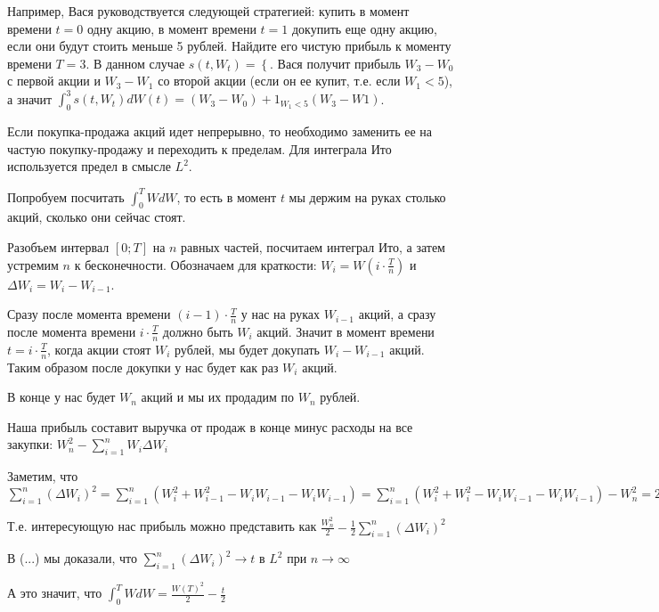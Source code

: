 {\begin{myex} Например, Вася руководствуется следующей стратегией: купить в момент времени $t=0$ одну акцию, в момент времени $t=1$ докупить еще одну акцию, если они будут стоить меньше 5 рублей. Найдите его чистую прибыль к моменту времени $T=3$. В данном случае $s(t,W_{t})=\left\{ \right.$. Вася получит прибыль $W_{3}-W_{0}$ с первой акции и $W_{3}-W_{1}$ со второй акции (если он ее купит, т.е. если $W_{1}<5$), а значит $\int_{0}^{3}s(t,W_{t})dW(t)=(W_{3}-W_{0})+1_{W_{1}<5}(W_{3}-W{1})$. 
\end{myex}

Если покупка-продажа акций идет непрерывно, то необходимо заменить ее на частую покупку-продажу и переходить к пределам. Для интеграла Ито используется предел в смысле $L^{2}$. 

\begin{myex} Попробуем посчитать $\int_{0}^{T}WdW$, то есть в момент $t$ мы держим на руках столько акций, сколько они сейчас стоят.

Разобъем интервал $[0;T]$ на $n$ равных частей, посчитаем интеграл Ито, а затем устремим $n$ к бесконечности.
Обозначаем для краткости: $W_{i}=W(i\cdot \frac{T}{n})$ и $\Delta W_{i}=W_{i}-W_{i-1}$.

Сразу после момента времени $(i-1)\cdot \frac{T}{n}$ у нас на руках $W_{i-1}$ акций, а сразу после момента времени $i\cdot \frac{T}{n}$ должно быть $W_{i}$ акций. Значит в момент времени $t=i\cdot \frac{T}{n}$, когда акции стоят $W_{i}$ рублей, мы будет докупать $W_{i}-W_{i-1}$ акций. Таким образом после докупки у нас будет как раз $W_{i}$ акций. \par
В конце у нас будет $W_{n}$ акций и мы их продадим по $W_{n}$ рублей. \par
Наша прибыль составит выручка от продаж в конце минус расходы на все закупки: $W_{n}^{2}-\sum_{i=1}^{n}W_{i}\Delta W_{i}$ \par
Заметим, что $\sum_{i=1}^{n}(\Delta W_{i})^{2}=\sum_{i=1}^{n}(W_{i}^{2}+W_{i-1}^{2}-W_{i}W_{i-1}-W_{i}W_{i-1})=\sum_{i=1}^{n}(W_{i}^{2}+W_{i}^{2}-W_{i}W_{i-1}-W_{i}W_{i-1})-W_{n}^{2}=2\sum_{i=1}^{n}W_{i}\Delta W_{i}-W_{n}^{2}$ \par
Т.е. интересующую нас прибыль можно представить как $\frac{W_{n}^{2}}{2}-\frac{1}{2}\sum_{i=1}^{n}(\Delta W_{i})^{2}$ \par
В (...) мы доказали, что $\sum_{i=1}^{n}(\Delta W_{i})^{2}\to t$ в $L^{2}$ при $n\to\infty$ \par
А это значит, что $\int_{0}^{T}WdW=\frac{W(T)^{2}}{2}-\frac{t}{2}$ \par
\end{myex}


}
